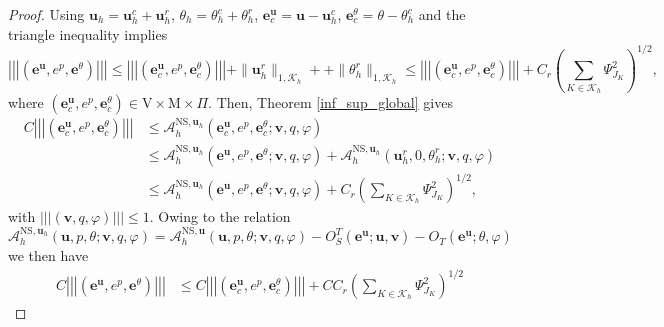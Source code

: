 \documentclass[10pt,a4paper]{article}
\begin{document}
\begin{proof}
    Using $\boldsymbol{u}_h = \boldsymbol{u}_h^c + \boldsymbol{u}_h^r$, $\theta_h = \theta_h^c + \theta_h^r$, $\boldsymbol{e}_c^{\boldsymbol{u}} = \boldsymbol{u} - \boldsymbol{u}_h^c$, $\boldsymbol{e}_c^{\theta} = \theta - \theta_h^c$ and the triangle inequality implies 
   $$
     \left|\!\left|\!\left|( \boldsymbol{e}^{\boldsymbol{u}} , e^p, \boldsymbol{e}^{\theta}) \right|\!\right|\!\right| \leq \left|\!\left|\!\left| (\boldsymbol{e}_c^{\boldsymbol{u}} , e^p, \boldsymbol{e}_c^{\theta} )\right|\!\right|\!\right| + \|\boldsymbol{u}_h^r\|_{1,\mathcal{K}_h} + + \|\theta_h^r\|_{1,\mathcal{K}_h} \leq  \left|\!\left|\!\left| (\boldsymbol{e}_c^{\boldsymbol{u}}, e^p, \boldsymbol{e}_c^{\theta}) \right|\!\right|\!\right| + C_r \left( \sum_{K \in \mathcal{K}_h} \Psi_{J_K}^2 \right)^{1/2},  
   $$
   where $(\boldsymbol{e}_c^{\boldsymbol{u}}, e^p, \boldsymbol{e}_c^{\theta}) \in\mathrm{V}\times \mathrm{M} \times \Pi$. Then, Theorem \ref{inf_sup_global} gives 
   \begin{align*}
       C \left|\!\left|\!\left| (\boldsymbol{e}_c^{\boldsymbol{u}}, e^p, \boldsymbol{e}_c^{\theta}) \right|\!\right|\!\right| & \leq\mathcal{A}_h^{\mathrm{NS},\boldsymbol{u}_h} (\boldsymbol{e}_c^{\boldsymbol{u}}, e^p, \boldsymbol{e}_c^{\theta}; \boldsymbol{v},q, \varphi )  \\ & \leq  \mathcal{A}_h^{\mathrm{NS},\boldsymbol{u}_h} (\boldsymbol{e}^{\boldsymbol{u}}, e^p, \boldsymbol{e}^{\theta}; \boldsymbol{v},q, \varphi ) + \mathcal{A}_h^{\mathrm{NS},\boldsymbol{u}_h} (\boldsymbol{u}_h^r, 0, \theta_h^r; \boldsymbol{v},q, \varphi ) \\ & \leq \mathcal{A}_h^{\mathrm{NS},\boldsymbol{u}_h} (\boldsymbol{e}^{\boldsymbol{u}}, e^p, \boldsymbol{e}^{\theta}; \boldsymbol{v},q, \varphi) + C_r \left( \sum_{K \in \mathcal{K}_h} \Psi_{J_K}^2 \right)^{1/2}, 
   \end{align*}
   with $\left|\!\left|\!\left|(\boldsymbol{v},q, \varphi) \right|\!\right|\!\right| \leq   1 $. Owing to the relation 
   $$
  \mathcal{A}_h^{\mathrm{NS},\boldsymbol{u}_h}(\boldsymbol{u},p, \theta;\boldsymbol{v},q, \varphi) = \mathcal{A}_h^{\mathrm{NS},\boldsymbol{u}}(\boldsymbol{u},p, \theta;\boldsymbol{v},q,\varphi) - O_S^T(\boldsymbol{e}^{\boldsymbol{u}}; \boldsymbol{u}, \boldsymbol{v}) -O_T(\boldsymbol{e}^{\boldsymbol{u}}; \theta, \varphi)
   $$
   we then have 
   \begin{align*}
       C \left|\!\left|\!\left|( \boldsymbol{e}^{\boldsymbol{u}}, e^p, \boldsymbol{e}^{\theta}) \right|\!\right|\!\right| & \leq C \left|\!\left|\!\left|( \boldsymbol{e}_c^{\boldsymbol{u}}, e^p, \boldsymbol{e}^{\theta}_c ) \right|\!\right|\!\right| + C C_r \left( \sum_{K \in \mathcal{K}_h} \Psi_{J_K} ^2 \right)^{1/2} 

\end{align*}
\end{proof}
\end{document}
